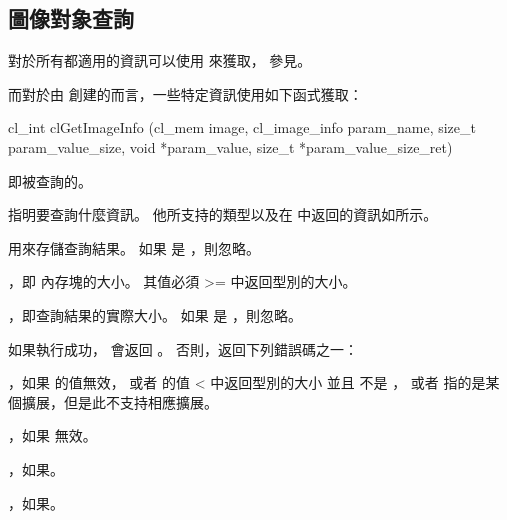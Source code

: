 \subsection{圖像對象查詢}

對於所有都適用的資訊可以使用  來獲取，
參見。

而對於由  創建的而言，一些特定資訊使用如下函式獲取：


\startCLFUNC
cl_int clGetImageInfo (cl_mem image,
			cl_image_info param_name,
			size_t param_value_size,
			void *param_value,
			size_t *param_value_size_ret)
\stopCLFUNC

 即被查詢的。

 指明要查詢什麼資訊。
他所支持的類型以及在  中返回的資訊如所示。

 用來存儲查詢結果。
如果  是 ，則忽略。

，即  內存塊的大小。
其值必須 >= 中返回型別的大小。

，即查詢結果的實際大小。
如果  是 ，則忽略。

如果執行成功，  會返回 。
否則，返回下列錯誤碼之一：
\startigBase
\item {}，如果  的值無效，
或者  的值 < 中返回型別的大小
並且  不是 ，
或者  指的是某個擴展，但是此不支持相應擴展。

\item {}，如果  無效。

\item {}，如果\scdevfailres。
\item {}，如果\schostfailres。
\stopigBase

{}

